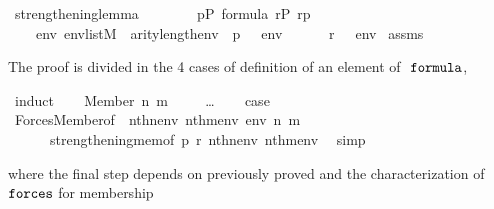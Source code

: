 \begin{isabelle}
\isamarkupfalse%
\ strengthening{\isacharunderscore}lemma{\isacharcolon}\isanewline
\ \ \ \isanewline
\ \ \ \ {\isachardoublequoteopen}p{\isasymin}P{\isachardoublequoteclose}\ {\isachardoublequoteopen}{\isasymphi}{\isasymin}formula{\isachardoublequoteclose}\ {\isachardoublequoteopen}r{\isasymin}P{\isachardoublequoteclose}\ {\isachardoublequoteopen}r{\isasympreceq}p{\isachardoublequoteclose}\isanewline
\ \ \isanewline
\ \ \ \ {\isachardoublequoteopen}{\isasymAnd}env{\isachardot}\ env{\isasymin}list{\isacharparenleft}M{\isacharparenright}\ {\isasymLongrightarrow}\ arity{\isacharparenleft}{\isasymphi}{\isacharparenright}{\isasymle}length{\isacharparenleft}env{\isacharparenright}\ {\isasymLongrightarrow}\ p\ {\isasymtturnstile}\ {\isasymphi}\ env\isanewline 
\ \ \ \ \ {\isasymLongrightarrow}\ r\ {\isasymtturnstile}\ {\isasymphi}\ env{\isachardoublequoteclose}\isanewline
%
%
\isamarkupfalse%
\ assms{\isacharparenleft}{}{\isacharparenright}
\end{isabelle}
%
The proof is divided in the 4 cases of definition of an element of $\formula$,
%
\begin{isabelle}
\isamarkupfalse%
\ {\isacharparenleft}induct{\isacharparenright}\isanewline
\ \ \isamarkupfalse%
\ {\isacharparenleft}Member\ n\ m{\isacharparenright}\isanewline
\ \ \isamarkupfalse%
\isanewline
\ \ \dots
\isanewline
\ \ \isamarkupfalse%
\ {\isacharquery}case\ \isanewline
\ \ \ \ \isamarkupfalse%
\ Forces{\isacharunderscore}Member{\isacharbrackleft}of\ {\isacharunderscore}\ {\isachardoublequoteopen}nth{\isacharparenleft}n{\isacharcomma}env{\isacharparenright}{\isachardoublequoteclose}\ {\isachardoublequoteopen}nth{\isacharparenleft}m{\isacharcomma}env{\isacharparenright}{\isachardoublequoteclose}\ env\ n\ m{\isacharbrackright}\isanewline
\ \ \ \ \ \ strengthening{\isacharunderscore}mem{\isacharbrackleft}of\ p\ r\ {\isachardoublequoteopen}nth{\isacharparenleft}n{\isacharcomma}env{\isacharparenright}{\isachardoublequoteclose}\ {\isachardoublequoteopen}nth{\isacharparenleft}m{\isacharcomma}env{\isacharparenright}{\isachardoublequoteclose}{\isacharbrackright}\ \isamarkupfalse%
\ simp
\end{isabelle}
%
where the final step depends on previously proved
 and the characterization of
$\mathop{\mathtt{forces}}$ for membership 


